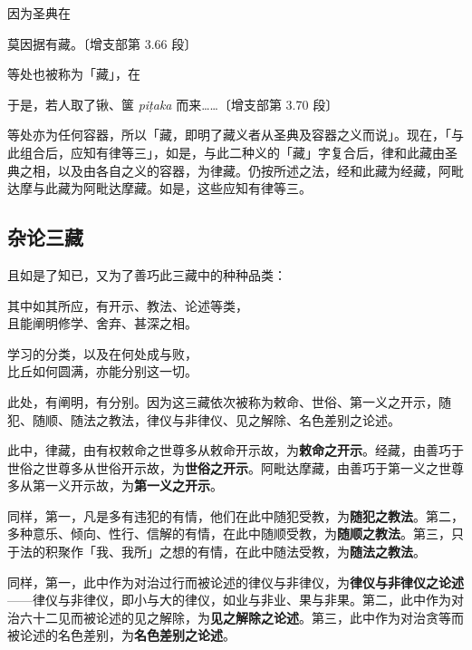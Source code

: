 因为圣典在

\begin{quoting}莫因据有藏。{\bluefootnotesize 〔增支部第 3.66 段〕}\end{quoting}

等处也被称为「藏」，在

\begin{quoting}于是，若人取了锹、箧 {\footnotesize \textit{piṭaka}} 而来……{\bluefootnotesize 〔增支部第 3.70 段〕}\end{quoting}

等处亦为任何容器，所以「藏，即明了藏义者从圣典及容器之义而说」。现在，「与此组合后，应知有律等三」，如是，与此二种义的「藏」字复合后，律和此藏由圣典之相，以及由各自之义的容器，为律藏。仍按所述之法，经和此藏为经藏，阿毗达摩与此藏为阿毗达摩藏。如是，这些应知有律等三。

\subsection*{杂论三藏}

且如是了知已，又为了善巧此三藏中的种种品类：

\begin{quoting}其中如其所应，有开示、教法、论述等类，\\且能阐明修学、舍弃、甚深之相。\end{quoting}

\begin{quoting}学习的分类，以及在何处成与败，\\比丘如何圆满，亦能分别这一切。\end{quoting}

此处，有阐明，有分别。因为这三藏依次被称为敕命、世俗、第一义之开示，随犯、随顺、随法之教法，律仪与非律仪、见之解除、名色差别之论述。

此中，律藏，由有权敕命之世尊多从敕命开示故，为\textbf{敕命之开示}。经藏，由善巧于世俗之世尊多从世俗开示故，为\textbf{世俗之开示}。阿毗达摩藏，由善巧于第一义之世尊多从第一义开示故，为\textbf{第一义之开示}。

同样，第一，凡是多有违犯的有情，他们在此中随犯受教，为\textbf{随犯之教法}。第二，多种意乐、倾向、性行、信解的有情，在此中随顺受教，为\textbf{随顺之教法}。第三，只于法的积聚作「我、我所」之想的有情，在此中随法受教，为\textbf{随法之教法}。

同样，第一，此中作为对治过行而被论述的律仪与非律仪，为\textbf{律仪与非律仪之论述}——律仪与非律仪，即小与大的律仪，如业与非业、果与非果。第二，此中作为对治六十二见而被论述的见之解除，为\textbf{见之解除之论述}。第三，此中作为对治贪等而被论述的名色差别，为\textbf{名色差别之论述}。

